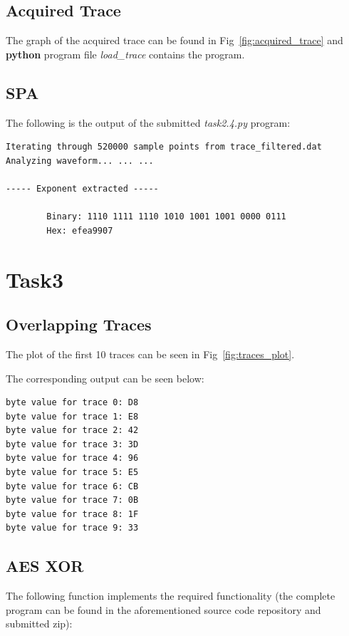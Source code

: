 \documentclass[1p,16pt]{elsarticle}
\begin{document}
\subsection{Acquired Trace}%
\label{sub:acquired_trace}
The graph of the acquired trace can be found in Fig~\ref{fig:acquired_trace} and
\textbf{python} program file \textit{load\_trace} contains the program.

\subsection{SPA}%
\label{sub:spa}

The following is the output of the submitted \textit{task2.4.py} program:
\begin{verbatim}
Iterating through 520000 sample points from trace_filtered.dat
Analyzing waveform... ... ...

----- Exponent extracted -----

        Binary: 1110 1111 1110 1010 1001 1001 0000 0111
		Hex: efea9907
\end{verbatim}

\section{Task3}

\subsection{Overlapping Traces}%
\label{sub:overlapping_traces}

The plot of the first 10 traces can be seen in Fig~\ref{fig:traces_plot}.
\par
The corresponding output can be seen below:
\begin{verbatim}
byte value for trace 0: D8
byte value for trace 1: E8
byte value for trace 2: 42
byte value for trace 3: 3D
byte value for trace 4: 96
byte value for trace 5: E5
byte value for trace 6: CB
byte value for trace 7: 0B
byte value for trace 8: 1F
byte value for trace 9: 33
\end{verbatim}

\subsection{AES XOR}%
\label{ssub:aes_xor}
The following function implements the required functionality (the complete program can be found in the aforementioned source code repository and submitted zip):
\end{document}
